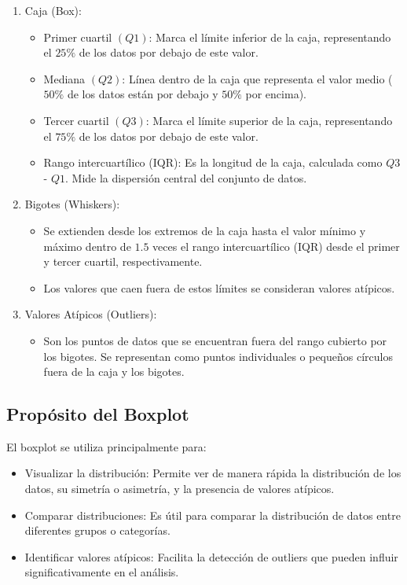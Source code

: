 \documentclass[
  us-letterpaper,
]{scrreprt}
\providecommand{\tightlist}{%
  \setlength{\itemsep}{0pt}\setlength{\parskip}{0pt}}\usepackage{longtable,booktabs,array}
\theoremstyle{plain}
\theoremstyle{plain}
\theoremstyle{definition}
\theoremstyle{remark}
\begin{document}
\begin{enumerate}
\def\labelenumi{\arabic{enumi}.}
\item
  Caja (Box):

  \begin{itemize}
  \item
    Primer cuartil \((Q1)\): Marca el límite inferior de la caja,
    representando el \(25\%\) de los datos por debajo de este valor.
  \item
    Mediana \((Q2)\): Línea dentro de la caja que representa el valor
    medio (\(50\%\) de los datos están por debajo y \(50\%\) por
    encima).
  \item
    Tercer cuartil \((Q3)\): Marca el límite superior de la caja,
    representando el \(75\%\) de los datos por debajo de este valor.
  \item
    Rango intercuartílico (IQR): Es la longitud de la caja, calculada
    como \(Q3\) - \(Q1\). Mide la dispersión central del conjunto de
    datos.
  \end{itemize}
\item
  Bigotes (Whiskers):

  \begin{itemize}
  \item
    Se extienden desde los extremos de la caja hasta el valor mínimo y
    máximo dentro de \(1.5\) veces el rango intercuartílico (IQR) desde
    el primer y tercer cuartil, respectivamente.
  \item
    Los valores que caen fuera de estos límites se consideran valores
    atípicos.
  \end{itemize}
\item
  Valores Atípicos (Outliers):

  \begin{itemize}
  \tightlist
  \item
    Son los puntos de datos que se encuentran fuera del rango cubierto
    por los bigotes. Se representan como puntos individuales o pequeños
    círculos fuera de la caja y los bigotes.
  \end{itemize}
\end{enumerate}

\subsection{Propósito del Boxplot}\label{propuxf3sito-del-boxplot}

El boxplot se utiliza principalmente para:

\begin{itemize}
\item
  Visualizar la distribución: Permite ver de manera rápida la
  distribución de los datos, su simetría o asimetría, y la presencia de
  valores atípicos.
\item
  Comparar distribuciones: Es útil para comparar la distribución de
  datos entre diferentes grupos o categorías.
\item
  Identificar valores atípicos: Facilita la detección de outliers que
  pueden influir significativamente en el análisis.
\end{itemize}
\end{document}
